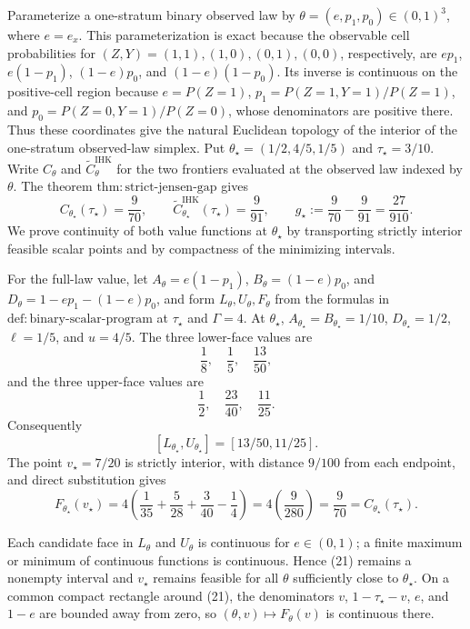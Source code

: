 Parameterize a one-stratum binary observed law by \(\theta=(e,p_1,p_0)\in(0,1)^3\), where \(e=e_x\).  This parameterization is exact because the observable cell probabilities for \((Z,Y)=(1,1),(1,0),(0,1),(0,0)\), respectively, are \(ep_1\), \(e(1-p_1)\), \((1-e)p_0\), and \((1-e)(1-p_0)\).  Its inverse is continuous on the positive-cell region because \(e=P(Z=1)\), \(p_1=P(Z=1,Y=1)/P(Z=1)\), and \(p_0=P(Z=0,Y=1)/P(Z=0)\), whose denominators are positive there.  Thus these coordinates give the natural Euclidean topology of the interior of the one-stratum observed-law simplex.  Put \(\theta_\star=(1/2,4/5,1/5)\) and \(\tau_\star=3/10\).  Write \(C_\theta\) and \(\widetilde C^{\mathrm{IHK}}_\theta\) for the two frontiers evaluated at the observed law indexed by \(\theta\).  The theorem \(\mathrm{thm{:}strict\mbox{-}jensen\mbox{-}gap}\) gives
\[
 C_{\theta_\star}(\tau_\star)=\frac{9}{70},\qquad
 \widetilde C^{\mathrm{IHK}}_{\theta_\star}(\tau_\star)=\frac{9}{91},\qquad
 g_\star:=\frac{9}{70}-\frac{9}{91}=\frac{27}{910}. \tag{20}
\]
We prove continuity of both value functions at \(\theta_\star\) by transporting strictly interior feasible scalar points and by compactness of the minimizing intervals.

For the full-law value, let \(A_\theta=e(1-p_1)\), \(B_\theta=(1-e)p_0\), and \(D_\theta=1-ep_1-(1-e)p_0\), and form \(L_\theta,U_\theta,F_\theta\) from the formulas in \(\mathrm{def{:}binary\mbox{-}scalar\mbox{-}program}\) at \(\tau_\star\) and \(\Gamma=4\).  At \(\theta_\star\), \(A_{\theta_\star}=B_{\theta_\star}=1/10\), \(D_{\theta_\star}=1/2\), \(\ell=1/5\), and \(u=4/5\).  The three lower-face values are
\[
 \frac18,\quad\frac15,\quad\frac{13}{50},
\]
and the three upper-face values are
\[
 \frac12,\quad\frac{23}{40},\quad\frac{11}{25}.
\]
Consequently
\[
 [L_{\theta_\star},U_{\theta_\star}]=[13/50,11/25]. \tag{21}
\]
The point \(v_\star=7/20\) is strictly interior, with distance \(9/100\) from each endpoint, and direct substitution gives
\[
 F_{\theta_\star}(v_\star)
 =4\left(\frac1{35}+\frac5{28}+\frac3{40}-\frac14\right)
 =4\left(\frac9{280}\right)
 =\frac{9}{70}=C_{\theta_\star}(\tau_\star). \tag{22}
\]

Each candidate face in \(L_\theta\) and \(U_\theta\) is continuous for \(e\in(0,1)\); a finite maximum or minimum of continuous functions is continuous.  Hence (21) remains a nonempty interval and \(v_\star\) remains feasible for all \(\theta\) sufficiently close to \(\theta_\star\).  On a common compact rectangle around (21), the denominators \(v\), \(1-\tau_\star-v\), \(e\), and \(1-e\) are bounded away from zero, so \((\theta,v)\mapsto F_\theta(v)\) is continuous there.

